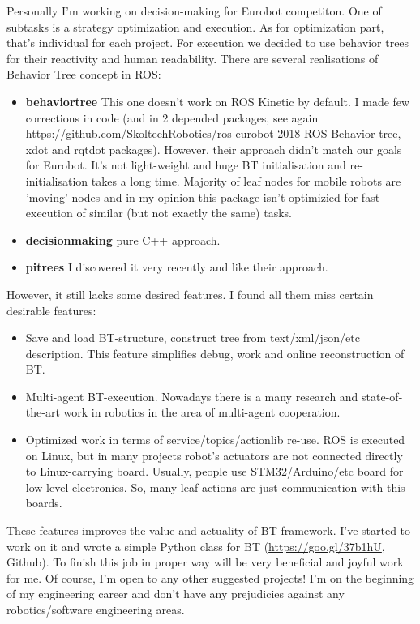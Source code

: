 \documentclass[11pt,a4paper,roman]{moderncv}        %
\begin{document}
Personally I'm working on decision-making for Eurobot competiton. One of subtasks is a strategy optimization and execution. As for optimization part, that's individual for each project. For execution we decided to use behavior trees for their reactivity and human readability. There are several realisations of Behavior Tree concept in ROS:
\begin{itemize}
	\item \textbf{behavior\textunderscore tree} This one doesn't work on ROS Kinetic by default. I made few corrections in code (and in 2 depended packages, see again \url{https://github.com/SkoltechRobotics/ros-eurobot-2018} ROS-Behavior-tree, xdot and rqt\textunderscore dot packages). However, their approach didn't match our goals for Eurobot. It's not light-weight and huge BT initialisation and re-initialisation takes a long time. Majority of leaf nodes for mobile robots are 'moving' nodes and in my opinion this package isn't optimizied for fast-execution of similar (but not exactly the same) tasks.
	\item \textbf{decision\textunderscore making} pure C++ approach. 
	\item \textbf{pi\textunderscore trees}  I discovered it very recently and like their approach.
\end{itemize}
However, it still lacks some desired features.
I found all them miss certain desirable features:
\begin{itemize}
	\item Save and load BT-structure, construct tree from text/xml/json/etc description. This feature simplifies debug, work and online reconstruction of BT.
	\item Multi-agent BT-execution. Nowadays there is a many research and state-of-the-art work in robotics in the area of multi-agent cooperation.
	\item Optimized work in terms of service/topics/actionlib re-use. ROS is executed on Linux, but in many projects robot's actuators are not connected directly to Linux-carrying board. Usually, people use STM32/Arduino/etc board for low-level electronics. So, many leaf actions are just communication with this boards.
\end{itemize}

These features improves the value and actuality of BT framework. I've started to work on it and wrote a simple Python class for BT (\url{https://goo.gl/37b1hU}, Github). To finish this job in proper way will be very beneficial and joyful work for me. 
\newline
\newline
Of course, I'm open to any other suggested projects! I'm on the beginning of my engineering career and don't have any prejudicies against any robotics/software engineering areas.
\makeletterclosing
\end{document}
